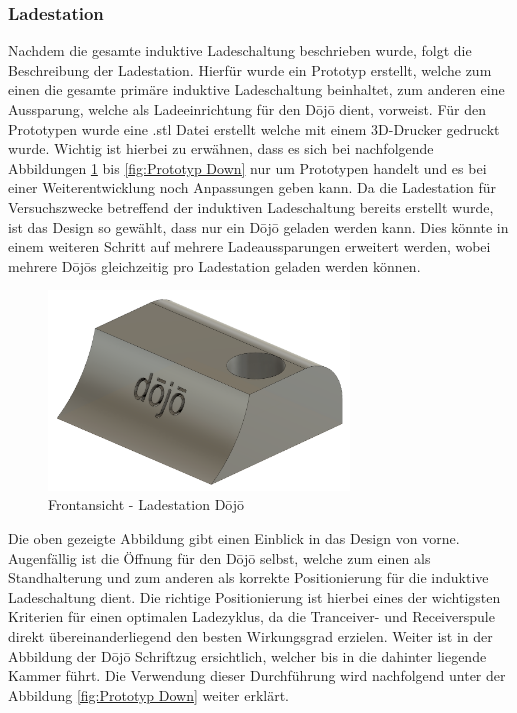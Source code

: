 \subsubsection*{Ladestation}

Nachdem die gesamte induktive Ladeschaltung beschrieben wurde, folgt die Beschreibung der Ladestation. Hierfür wurde ein Prototyp erstellt, welche zum einen die gesamte primäre induktive Ladeschaltung beinhaltet, zum anderen eine Aussparung, welche als Ladeeinrichtung für den Dōjō dient, vorweist. Für den Prototypen wurde eine .stl Datei erstellt welche mit einem 3D-Drucker gedruckt wurde. Wichtig ist hierbei zu erwähnen, dass es sich bei nachfolgende Abbildungen \ref{fig:Prototyp Front} bis \ref{fig:Prototyp Down} nur um Prototypen handelt und es bei einer Weiterentwicklung noch Anpassungen geben kann. Da die Ladestation für Versuchszwecke betreffend der induktiven Ladeschaltung bereits erstellt wurde, ist das Design so gewählt, dass nur ein Dōjō geladen werden kann. Dies könnte in einem weiteren Schritt auf mehrere Ladeaussparungen erweitert werden, wobei mehrere Dōjōs gleichzeitig pro Ladestation geladen werden können. 

\begin{figure}[H]
	\begin{center}
		\includegraphics[width=80mm]{data/DojoLadestation01.png}
		\caption[Prototyp Ladestation Frontansicht]{Frontansicht - Ladestation Dōjō} %
		\label{fig:Prototyp Front}
	\end{center}
\end{figure}

Die oben gezeigte Abbildung gibt einen Einblick in das Design von vorne. Augenfällig ist die Öffnung für den Dōjō selbst, welche zum einen als Standhalterung und zum anderen als korrekte Positionierung für die induktive Ladeschaltung dient. Die richtige Positionierung ist hierbei eines der wichtigsten Kriterien für einen optimalen Ladezyklus, da die Tranceiver- und Receiverspule direkt übereinanderliegend den besten Wirkungsgrad erzielen. Weiter ist in der Abbildung der Dōjō Schriftzug ersichtlich, welcher bis in die dahinter liegende Kammer führt. Die Verwendung dieser Durchführung wird nachfolgend unter der Abbildung \ref{fig:Prototyp Down} weiter erklärt. 



